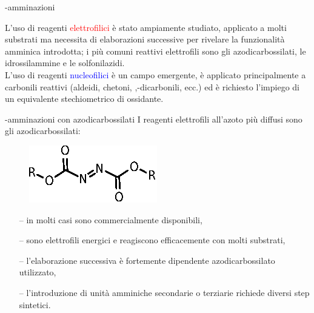 \documentclass[10pt]{beamer}
\begin{document}
\begin{frame}[fragile]{{\textalpha}-amminazioni}

L'uso di reagenti \textcolor{red}{elettrofilici} è stato \alert{ampiamente studiato}, applicato a molti substrati ma necessita di \alert{elaborazioni successive} per rivelare la funzionalità amminica introdotta; i più comuni reattivi elettrofili sono gli azodicarbossilati, le idrossilammine e le solfonilazidi.\\\vspace{3mm}
L'uso di reagenti \textcolor{blue}{nucleofilici} è un campo emergente, è applicato principalmente a \alert{carbonili reattivi} (aldeidi, chetoni, {\textalpha},{\textbeta}-dicarbonili, ecc.) ed è richiesto l'impiego di un equivalente \alert{stechiometrico di ossidante}.\\
\end{frame}

\begin{frame}[fragile]{{\textalpha}-amminazioni con azodicarbossilati}
I reagenti elettrofili all'azoto più diffusi sono gli \alert{azodicarbossilati}:
  \begin{figure}[H]  	
	\centering
	\includegraphics[scale=0.7]{P_azodicarboxylate.eps}
\end{figure}  

\begin{itemize}
	\item[--] in molti casi sono commercialmente disponibili,
	\item[--] sono elettrofili energici e reagiscono efficacemente con molti substrati,
	\item[--] \alert{l'elaborazione successiva è fortemente dipendente azodicarbossilato utilizzato},
	\item[--] l'introduzione di unità amminiche secondarie o terziarie richiede diversi step sintetici.
\end{itemize}

\end{frame}
\end{document}
